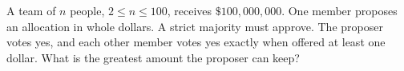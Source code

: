 A team of $n$ people, $2\le n\le100$, receives $\$100{,}000{,}000$. One member proposes an allocation in whole dollars. A strict majority must approve. The proposer votes yes, and each other member votes yes exactly when offered at least one dollar. What is the greatest amount the proposer can keep?
